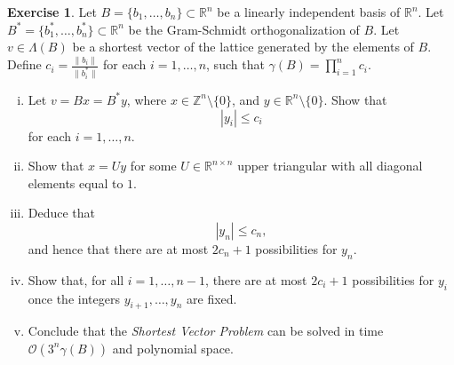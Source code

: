 \documentclass[12pt,a4paper]{article}
\theoremstyle{plain}
\newtheorem*{Sol*}{Solution}
\theoremstyle{definition}
\newtheorem{Ex}{Exercise}
\def \R {\mathbb R}
\def \Z {\mathbb Z}
\newif\ifsolutions
\newcommand{\exercise}[2]{
			\begin{Ex} #1 \end{Ex}
			\ifsolutions  \begin{Sol*} #2 \end{Sol*} \bigskip \else \bigskip  \fi
		}
\begin{document}
\exercise{
	Let $B = \{b_1,\dots,b_n\} \subset \R^n$ be a linearly independent basis of $\R^n$. 
	Let $B^* = \{b_1^*,\dots,b_n^*\} \subset \R^n$ be the Gram-Schmidt orthogonalization of $B$.
	Let $v \in \Lambda(B)$ be a shortest vector of the lattice generated by the elements of $B$.
	Define $c_i =  \frac{\| b_i \|}{\| b_i^* \|}$ for each $i = 1, \dots, n$, such that $\gamma(B) = \prod_{i=1}^n c_i$.
	\begin{enumerate}[i)]
		\item Let $v = Bx = B^*y$, where $x \in \Z^{n} \setminus \{0\}$, and $y \in \R^{n} \setminus \{0\}$.
		Show that
			\[ | y_i | \leq c_i \]
		for each $i=1, \dots, n$.
		\item Show that $ x = U y$ for some $U \in \R^{n \times n}$ upper triangular with all diagonal elements equal to $1$.
		\item Deduce that 
			\[ | y_n | \leq c_n, \]
		and hence that there are at most $2c_n + 1$ possibilities for $y_n$.
		\item Show that, for all $i=1, \dots, n-1$, there are at most $2 c_i + 1$ possibilities for $y_i$ once the integers $y_{i+1}, \dots, y_n$ are fixed.
		\item Conclude that the \emph{Shortest Vector Problem} can be solved in time $\mathcal{O}\left(3^n \gamma(B)\right)$ and polynomial space.
	\end{enumerate}
}
{}
\end{document}
